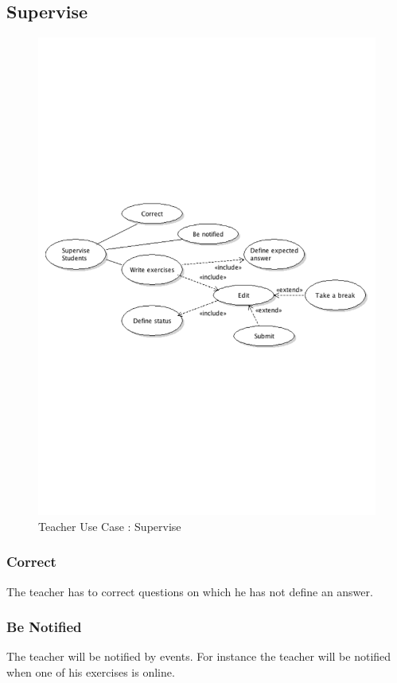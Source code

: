 	\subsection{Supervise}
		\begin{figure}[ht]
			\begin{center}
				\includegraphics[width=\textwidth,  trim=2cm 10cm 2cm 10cm]{UML_figure/UC/teacher/UC_Teacher_Supervise.pdf}
				\caption{Teacher Use Case : Supervise}
			\end{center}
		\end{figure}
		\subsubsection{Correct}
			The teacher has to correct questions on which he has not define an answer.
		\subsubsection{Be Notified}
			The teacher will be notified by events.
			For instance the teacher will be notified when one of his exercises is online.
